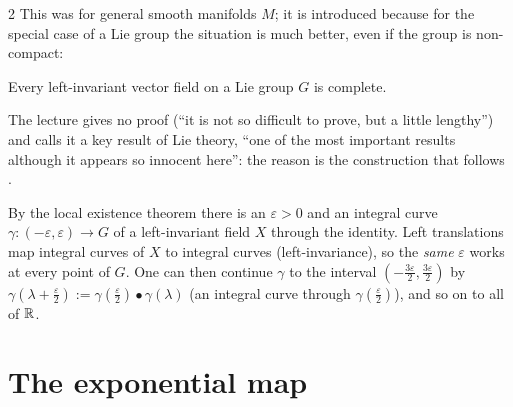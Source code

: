 \begin{paracol}{2}
This was for general smooth manifolds $M$; it is introduced because for the special case of a Lie group the situation is much better, even if the group is non-compact:
\begin{theorem}\label{thm:rc-complete}
Every left-invariant vector field on a Lie group $G$ is complete.  
\end{theorem}
The lecture gives no proof (``it is not so difficult to prove, but a little lengthy'') and calls it a key result of Lie theory, ``one of the most important results although it appears so innocent here'': the reason is the construction that follows  .
\begin{coursenote}
By the local existence theorem there is an $\varepsilon>0$ and an integral curve $\gamma\colon(-\varepsilon,\varepsilon)\to G$ of a left-invariant field $X$ through the identity. Left translations map integral curves of $X$ to integral curves (left-invariance), so the \emph{same} $\varepsilon$ works at every point of $G$. One can then continue $\gamma$ to the interval $(-\frac{3\varepsilon}2,\frac{3\varepsilon}2)$ by $\gamma(\lambda+\frac\varepsilon2):=\gamma(\frac\varepsilon2)\bullet\gamma(\lambda)$ (an integral curve through $\gamma(\frac\varepsilon2)$), and so on to all of $\mathbb{R}$. 
\end{coursenote}

\section{The exponential map}\label{sec:rc-exp}


\end{paracol}
